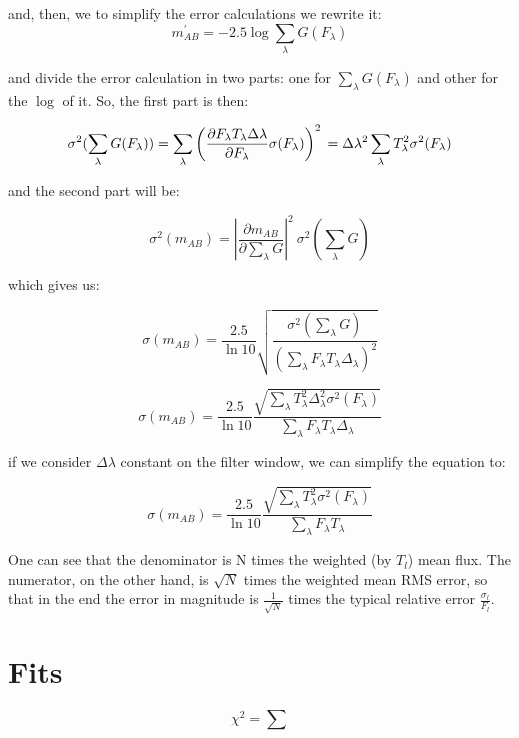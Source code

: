 \documentclass[11pt]{article}
\def\ni{\noindent}                                       %
\begin{document}
and, then, we to simplify the error calculations we rewrite it:
\begin{equation}
m_{A B}^\prime = -2.5 \log \sum_\lambda G(F_\lambda)
\end{equation}

\ni and divide the error calculation in two parts: one for $\sum_\lambda G(F_\lambda)$ and other
for the $\log$ of it. So, the first part is then:

\begin{equation}
\sigma^2(\sum_\lambda G(F_\lambda))
= \sum_\lambda \left( \frac{\partial F_\lambda T_\lambda \Delta\lambda}{\partial F_\lambda} \sigma(F_\lambda) \right)^2 \\
= \Delta\lambda^2 \sum_\lambda T^2_\lambda \sigma^2(F_\lambda)
\end{equation}

\newpage{}

and the second part will be:

\begin{equation}
\sigma^2(m_{AB}) = \left|\frac{\partial m_{AB}}{\partial \sum_\lambda G}\right|^2\ \sigma^2 \left(\sum_\lambda G \right)
\end{equation}

which gives us:

\begin{equation}
\sigma(m_{AB}) = \frac{2.5}{\ln 10} \sqrt{\frac{ \sigma^2(\sum_\lambda G) }{\left(\sum_\lambda F_\lambda T_\lambda \Delta_\lambda\right)^2}}
\end{equation}

\begin{equation}
\sigma(m_{AB}) = \frac{2.5}{\ln 10} \frac{\sqrt{\sum_\lambda T^2_\lambda \Delta^2_\lambda \sigma^2(F_\lambda)}}
				                         {\sum_\lambda F_\lambda T_\lambda \Delta_\lambda}
\end{equation}

if we consider $\Delta \lambda$ constant on the filter window, we can simplify the equation to:

\begin{equation}
\sigma(m_{AB}) = \frac{2.5}{\ln 10} \frac{\sqrt{\sum_\lambda T^2_\lambda\sigma^2(F_\lambda)}}
											{   {\sum_\lambda F_\lambda T_\lambda} }
\end{equation}

One can see that the denominator is N times the weighted (by $T_l$) mean flux.
The numerator, on the other hand, is $\sqrt{N}$ times the weighted mean RMS
error, so that in the end the error in magnitude is $\frac{1}{\sqrt{N}}$ times
the typical relative error $\frac{\sigma_l}{F_l}$.

\section{Fits}

\begin{equation}
\chi^2 = \sum 
\end{equation}
\end{document}
